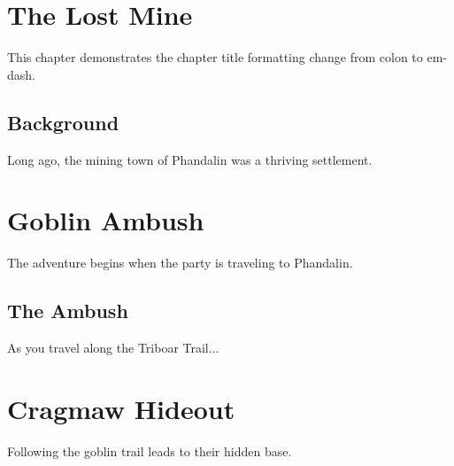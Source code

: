 \documentclass[letterpaper,twocolumn]{dndbook}
\begin{document}
\chapter{The Lost Mine}

This chapter demonstrates the chapter title formatting change from colon to em-dash.

\section{Background}

Long ago, the mining town of Phandalin was a thriving settlement.

\chapter{Goblin Ambush}

The adventure begins when the party is traveling to Phandalin.

\section{The Ambush}

As you travel along the Triboar Trail...

\chapter{Cragmaw Hideout}

Following the goblin trail leads to their hidden base.
\end{document}
